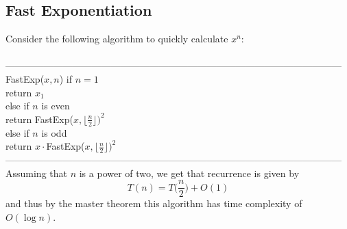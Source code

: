 \documentclass{article}
\newcommand{\x}{\cdot}
\newcommand{\floor}[1]{\lfloor #1 \rfloor}
\begin{document}
\subsection{Fast Exponentiation}
Consider the following algorithm to quickly calculate $x^n$:\\\\
---------------------------------------------------------------------------------------------------------
FastExp($x, n$)
	\hspace*{7mm} if $n=1$\\
	\hspace*{14mm} return $x_1$\\
	\hspace*{7mm} else if $n$ is even\\
	\hspace*{14mm} return FastExp($x, \floor{\frac{n}{2}})^2$\\
	\hspace*{7mm} else if $n$ is odd\\
	\hspace*{14mm} return $x\x$FastExp($x, \floor{\frac{n}{2}})^2$\\
---------------------------------------------------------------------------------------------------------\\
Assuming that $n$ is a power of two, we get that recurrence is given by
\[T(n) = T\Big(\frac{n}{2}\Big) + O(1)\]
and thus by the master theorem this algorithm has time complexity of $O(\log n)$.
\end{document}
